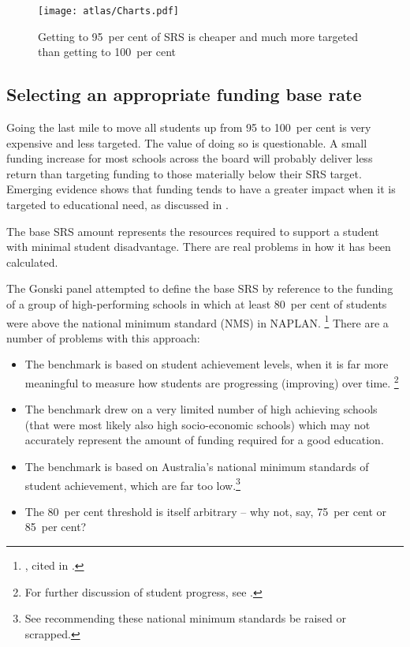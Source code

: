 \documentclass{grattan}
\begin{document}
\begin{figure}[p]
\caption{Getting to 95~per cent of SRS is cheaper and much more targeted than getting to 100~per cent\label{fig:getting-to-95pc-cheaper-more-targeted-than-100pc}}

\texttt{[image: atlas/Charts.pdf]}

\end{figure}




\subsection{Selecting an appropriate funding base rate} \label{subsec:Selecting-an-appropriate-funding-base-rate}

Going the last mile to move all students up from 95 to 100~per cent is very expensive and less targeted.
The value of doing so is questionable.
A small funding increase for most schools across the board will probably deliver less return than targeting funding to those materially below their SRS target.
Emerging evidence shows that funding tends to have a greater impact when it is targeted to educational need, as discussed in .

The base SRS amount represents the resources required to support a student with minimal student disadvantage. There are real problems in how it has been calculated.


The Gonski panel attempted to define the base SRS by reference to the funding of a group of high-performing schools in which at least 80~per cent of students were above the national minimum standard (NMS) in NAPLAN.%
\footnote{\textcite{Justman2013WhatsWrongGonski}, cited in \textcite{SenBackn.d.GovernmentSenatorsDissenting}.}
There are a number of problems with this approach:

\begin{itemize}[itemsep=1.2ex]
\item The benchmark is based on student achievement levels, when it is far more meaningful to measure how students are progressing (improving) over time.%
\footnote{For further discussion of student progress, see \textcites{Goss2016Wideninggapswhat}{Jensen2010MeasuringWhatMatters}.}
\item The benchmark drew on a very limited number of high achieving schools (that were most likely also high socio-economic schools) which may not accurately represent the amount of funding required for a good education.
\item The benchmark is based on Australia's national minimum standards of student achievement, which are far too low.\footnote{See \textcite{Goss2016Wideninggapswhat}  recommending these national minimum standards be raised or scrapped.}
\item The 80~per cent threshold is itself arbitrary -- why not, say, 75~per cent or 85~per cent?
\end{itemize}
\end{document}
